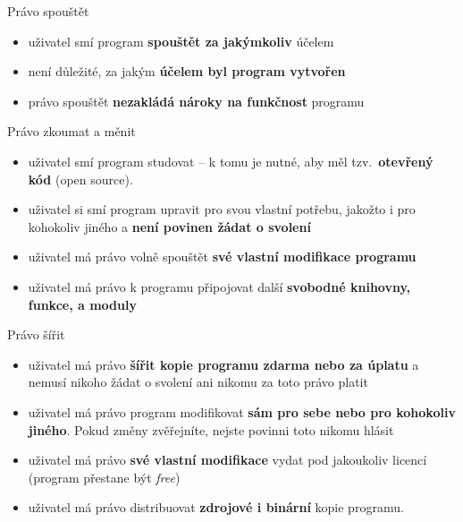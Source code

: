 \documentclass[11pt]{beamer}
\begin{document}
	\begin{frame}{Právo spouštět}
		\begin{itemize}
			\item uživatel smí program \textbf{spouštět za jakýmkoliv} účelem
			\item není důležité, za jakým \textbf{účelem byl program vytvořen}
			\item právo spouštět \textbf{nezakládá nároky na funkčnost} programu
		\end{itemize}
    \end{frame}	

	\begin{frame}{Právo zkoumat a měnit}
	\begin{itemize}
		\item uživatel smí program studovat -- k tomu je nutné, aby měl tzv.~\textbf{otevřený kód} (open source).
		\item uživatel si smí program upravit pro svou vlastní potřebu, jakožto i pro kohokoliv jiného a \textbf{není povinen žádat o svolení}
		\item uživatel má právo volně spouštět \textbf{své vlastní modifikace programu}
		\item uživatel má právo k programu připojovat další \textbf{svobodné knihovny, funkce, a moduly}
	\end{itemize}
	\end{frame}	

	\begin{frame}{Právo šířit}
	\begin{itemize}
		\item uživatel má právo \textbf{šířit kopie programu zdarma nebo za úplatu} a nemusí nikoho žádat o svolení ani nikomu za toto právo platit
		\item uživatel má právo program modifikovat \textbf{sám pro sebe nebo pro kohokoliv jiného}. Pokud změny zvěřejníte, nejste povinni toto nikomu hlásit
		\item uživatel má právo \textbf{své vlastní modifikace} vydat pod jakoukoliv licencí (program přestane být \textit{free})
		\item uživatel má právo distribuovat \textbf{zdrojové i binární} kopie programu.
	\end{itemize}
	\end{frame}	
\end{document}
